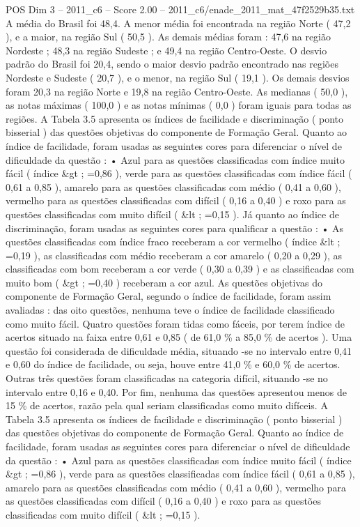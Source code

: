 \begin{textsample}{POS Dim 3 – 2011\_c6 – Score 2.00 – 2011\_c6/enade\_2011\_mat\_47f2529b35.txt}
A média do Brasil foi 48,4.
A menor média foi encontrada na região Norte ( 47,2 ), e a maior, na região Sul ( 50,5 ).
As demais médias foram : 47,6 na região Nordeste ; 48,3 na região Sudeste ; e 49,4 na região Centro-Oeste.
O desvio padrão do Brasil foi 20,4, sendo o maior desvio padrão encontrado nas regiões Nordeste e Sudeste ( 20,7 ), e o menor, na região Sul ( 19,1 ).
Os demais desvios foram 20,3 na região Norte e 19,8 na região Centro-Oeste.
As medianas ( 50,0 ), as notas máximas ( 100,0 ) e as notas mínimas ( 0,0 ) foram iguais para todas as regiões.
A Tabela 3.5 apresenta os índices de facilidade e discriminação ( ponto bisserial ) das questões objetivas do componente de Formação Geral.
Quanto ao índice de facilidade, foram usadas as seguintes cores para diferenciar o nível de dificuldade da questão : • Azul para as questões classificadas com índice muito fácil ( índice \&gt ; =0,86 ), verde para as questões classificadas com índice fácil ( 0,61 a 0,85 ), amarelo para as questões classificadas com médio ( 0,41 a 0,60 ), vermelho para as questões classificadas com difícil ( 0,16 a 0,40 ) e roxo para as questões classificadas com muito difícil ( \&lt ; =0,15 ).
Já quanto ao índice de discriminação, foram usadas as seguintes cores para qualificar a questão : • As questões classificadas com índice fraco receberam a cor vermelho ( índice \&lt ; =0,19 ), as classificadas com médio receberam a cor amarelo ( 0,20 a 0,29 ), as classificadas com bom receberam a cor verde ( 0,30 a 0,39 ) e as classificadas com muito bom ( \&gt ; =0,40 ) receberam a cor azul.
As questões objetivas do componente de Formação Geral, segundo o índice de facilidade, foram assim avaliadas : das oito questões, nenhuma teve o índice de facilidade classificado como muito fácil.
Quatro questões foram tidas como fáceis, por terem índice de acertos situado na faixa entre 0,61 e 0,85 ( de 61,0 \% a 85,0 \% de acertos ).
Uma questão foi considerada de dificuldade média, situando -se no intervalo entre 0,41 e 0,60 do índice de facilidade, ou seja, houve entre 41,0 \% e 60,0 \% de acertos.
Outras três questões foram classificadas na categoria difícil, situando -se no intervalo entre 0,16 e 0,40.
Por fim, nenhuma das questões apresentou menos de 15 \% de acertos, razão pela qual seriam classificadas como muito difíceis.
A Tabela 3.5 apresenta os índices de facilidade e discriminação ( ponto bisserial ) das questões objetivas do componente de Formação Geral.
Quanto ao índice de facilidade, foram usadas as seguintes cores para diferenciar o nível de dificuldade da questão : • Azul para as questões classificadas com índice muito fácil ( índice \&gt ; =0,86 ), verde para as questões classificadas com índice fácil ( 0,61 a 0,85 ), amarelo para as questões classificadas com médio ( 0,41 a 0,60 ), vermelho para as questões classificadas com difícil ( 0,16 a 0,40 ) e roxo para as questões classificadas com muito difícil ( \&lt ; =0,15 ).

\end{textsample}
